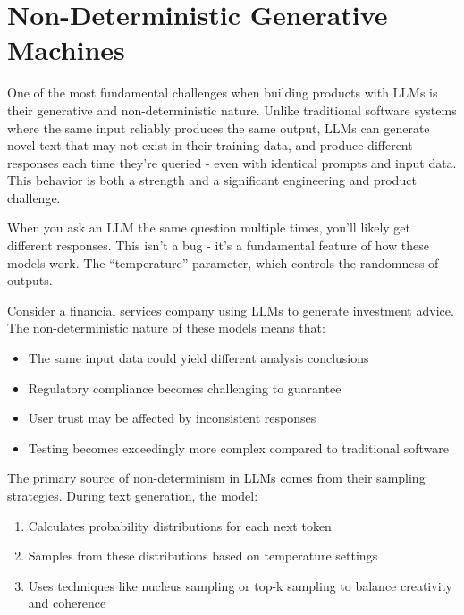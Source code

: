 \section{Non-Deterministic Generative Machines}

One of the most fundamental challenges when building products with LLMs is their generative and non-deterministic nature. Unlike traditional software systems where the same input reliably produces the same output, LLMs can generate novel text that may not exist in their training data, and produce different responses each time they're queried - even with identical prompts and input data. This behavior is both a strength and a significant engineering and product challenge.

When you ask an LLM the same question multiple times, you'll likely get different responses. This isn't a bug - it's a fundamental feature of how these models work. The ``temperature'' parameter, which controls the randomness of outputs.

Consider a financial services company using LLMs to generate investment advice. The non-deterministic nature of these models means that:
\begin{itemize}
    \item The same input data could yield different analysis conclusions
    \item Regulatory compliance becomes challenging to guarantee
    \item User trust may be affected by inconsistent responses
    \item Testing becomes exceedingly more complex compared to traditional software
\end{itemize}

The primary source of non-determinism in LLMs comes from their sampling strategies. During text generation, the model:
\begin{enumerate}
    \item Calculates probability distributions for each next token
    \item Samples from these distributions based on temperature settings
    \item Uses techniques like nucleus sampling  or top-k sampling to balance creativity and coherence
\end{enumerate}

